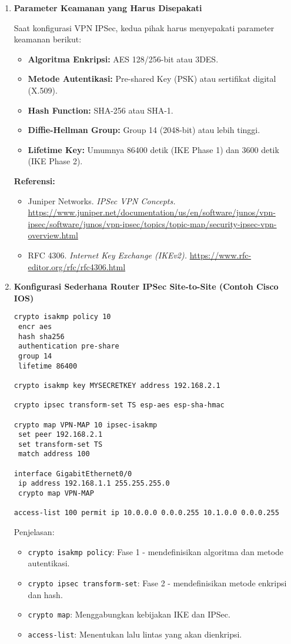 \begin{enumerate}
\item \textbf{Parameter Keamanan yang Harus Disepakati}

Saat konfigurasi VPN IPSec, kedua pihak harus menyepakati parameter keamanan berikut:

\begin{itemize}
	\item \textbf{Algoritma Enkripsi:} AES 128/256-bit atau 3DES.
	\item \textbf{Metode Autentikasi:} Pre-shared Key (PSK) atau sertifikat digital (X.509).
	\item \textbf{Hash Function:} SHA-256 atau SHA-1.
	\item \textbf{Diffie-Hellman Group:} Group 14 (2048-bit) atau lebih tinggi.
	\item \textbf{Lifetime Key:} Umumnya 86400 detik (IKE Phase 1) dan 3600 detik (IKE Phase 2).
\end{itemize}

\textbf{Referensi:}
\begin{itemize}
	\item Juniper Networks. \textit{IPSec VPN Concepts.} \url{https://www.juniper.net/documentation/us/en/software/junos/vpn-ipsec/software/junos/vpn-ipsec/topics/topic-map/security-ipsec-vpn-overview.html}
	\item RFC 4306. \textit{Internet Key Exchange (IKEv2).} \url{https://www.rfc-editor.org/rfc/rfc4306.html}
\end{itemize}

\item \textbf{Konfigurasi Sederhana Router IPSec Site-to-Site (Contoh Cisco IOS)}

\begin{lstlisting}
crypto isakmp policy 10
 encr aes
 hash sha256
 authentication pre-share
 group 14
 lifetime 86400

crypto isakmp key MYSECRETKEY address 192.168.2.1

crypto ipsec transform-set TS esp-aes esp-sha-hmac

crypto map VPN-MAP 10 ipsec-isakmp
 set peer 192.168.2.1
 set transform-set TS
 match address 100

interface GigabitEthernet0/0
 ip address 192.168.1.1 255.255.255.0
 crypto map VPN-MAP

access-list 100 permit ip 10.0.0.0 0.0.0.255 10.1.0.0 0.0.0.255
\end{lstlisting}

Penjelasan:
\begin{itemize}
	\item \texttt{crypto isakmp policy}: Fase 1 - mendefinisikan algoritma dan metode autentikasi.
	\item \texttt{crypto ipsec transform-set}: Fase 2 - mendefinisikan metode enkripsi dan hash.
	\item \texttt{crypto map}: Menggabungkan kebijakan IKE dan IPSec.
	\item \texttt{access-list}: Menentukan lalu lintas yang akan dienkripsi.
\end{itemize}


\end{enumerate}
